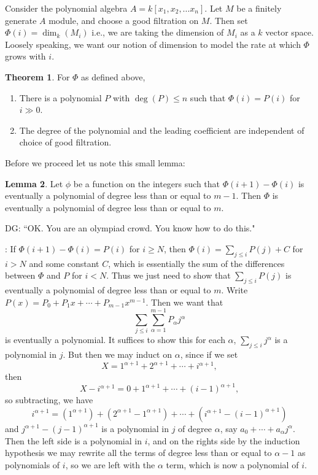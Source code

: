 \documentclass[12 pt]{article}
\theoremstyle{definition}
\newtheorem{theorem}{Theorem}[section]
\newtheorem{lemma}[theorem]{Lemma}
\begin{document}
Consider the polynomial algebra $A=k[x_1, x_2, \ldots x_n]$. Let $M$ be a finitely generate $A$ module, and choose a good filtration on $M$. Then set $\Phi(i)=\dim_k(M_i)$ i.e., we are taking the dimension of $M_i$ as a $k$ vector space. Loosely speaking, we want our notion of dimension to model the rate at which $\Phi$ grows with $i$.

\begin{theorem} For $\Phi$ as defined above,
\begin{enumerate}
\item There is a polynomial $P$ with $\deg(P) \leq n$ such that $\Phi(i)=P(i)$ for $i \gg 0$.
\item The degree of the polynomial and the leading coefficient are independent of choice of good filtration.
\end{enumerate}
\label{hilbertdim}
\end{theorem}

Before we proceed let us note this small lemma:
\begin{lemma} Let $\phi$ be a function on the integers such that $\Phi(i+1)-\Phi(i)$ is eventually a polynomial of degree less than or equal to $m-1$. Then $\Phi$ is eventually a polynomial of degree less than or equal to $m$.
\end{lemma}
DG: ``OK. You are an olympiad crowd. You know how to do this."

: If $\Phi(i+1)-\Phi(i)=P(i)$ for $i \geq N$, then $\Phi(i)=\sum_{j \leq i} P(j)+C$ for $i>N$ and some constant $C$, which is essentially the sum of the differences between $\Phi$ and $P$ for $i<N$. Thus we just need to show that $\sum_{j \leq i} P(j)$ is eventually a polynomial of degree less than or equal to $m$. Write $P(x)= P_0+P_1x+\cdots +P_{m-1}x^{m-1}$. Then we want that
\[\sum_{j \leq i} \sum_{\alpha=1}^{m-1}P_{\alpha}j^{\alpha}\]
is eventually a polynomial. It suffices to show this for each $\alpha$, $\sum_{j \leq i}j^{\alpha}$ is a polynomial in $j$. But then we may induct on $\alpha$, since if we set \[X=1^{\alpha+1}+2^{\alpha+1}+\cdots+i^{\alpha+1},\]
then
\[X-i^{\alpha+1}=0+1^{\alpha+1}+\cdots+(i-1)^{\alpha+1},\]
so subtracting, we have
\[i^{\alpha+1}=(1^{\alpha+1})+(2^{\alpha+1}-1^{\alpha+1})+\cdots+(i^{\alpha+1}-(i-1)^{\alpha+1})\]
and $j^{\alpha+1}-(j-1)^{\alpha+1}$ is a polynomial in $j$ of degree $\alpha$, say $a_0+\cdots+a_\alpha j^\alpha$. Then the left side is a polynomial in $i$, and on the rights side by the induction hypothesis we may rewrite all the terms of degree less than or equal to $\alpha-1$ as polynomials of $i$, so we are left with the $\alpha$ term, which is now a polynomial of $i$.
\end{document}
